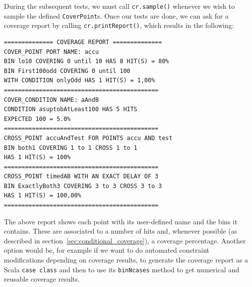 \documentclass[conference]{IEEEtran}
\begin{document}
During the subsequent tests, we must call \texttt{cr.sample()} whenever we wish to sample the defined \texttt{CoverPoint}s. %
Once our tests are done, we can ask for a coverage report by calling \texttt{cr.printReport()}, which results in the following: 
\begin{verbatim}
============== COVERAGE REPORT ==============
COVER_POINT PORT NAME: accu
BIN lo10 COVERING 0 until 10 HAS 8 HIT(S) = 80%
BIN First100odd COVERING 0 until 100 
WITH CONDITION onlyOdd HAS 1 HIT(S) = 1,00%
============================================
COVER_CONDITION NAME: aAndB
CONDITION asuptobAtLeast100 HAS 5 HITS 
EXPECTED 100 = 5.0%
============================================
CROSS_POINT accuAndTest FOR POINTS accu AND test
BIN both1 COVERING 1 to 1 CROSS 1 to 1 
HAS 1 HIT(S) = 100%
============================================
CROSS_POINT timedAB WITH AN EXACT DELAY OF 3
BIN ExactlyBoth3 COVERING 3 to 3 CROSS 3 to 3 
HAS 1 HIT(S) = 100,00%
============================================
\end{verbatim}
The above report shows each point with its user-defined name and the bins it contains. These are associated to a number of hits and, whenever possible (as described in section~\ref{sec:conditional_coverage}), a coverage percentage.
Another option would be, for example if we want to do automated constraint modifications depending on coverage results, to generate the coverage report as a Scala \texttt{case class} and then to use its \texttt{binNcases} method to get numerical and reusable coverage results.  
\end{document}
